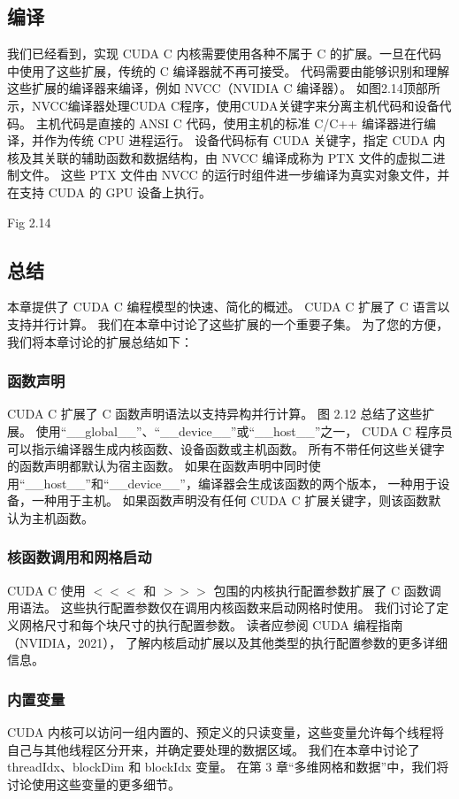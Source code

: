 \subsection{编译}
我们已经看到，实现 CUDA C 内核需要使用各种不属于 C 的扩展。一旦在代码中使用了这些扩展，传统的 C 编译器就不再可接受。 
代码需要由能够识别和理解这些扩展的编译器来编译，例如 NVCC（NVIDIA C 编译器）。 
如图2.14顶部所示，NVCC编译器处理CUDA C程序，使用CUDA关键字来分离主机代码和设备代码。 
主机代码是直接的 ANSI C 代码，使用主机的标准 C/C++ 编译器进行编译，并作为传统 CPU 进程运行。 
设备代码标有 CUDA 关键字，指定 CUDA 内核及其关联的辅助函数和数据结构，由 NVCC 编译成称为 PTX 文件的虚拟二进制文件。 
这些 PTX 文件由 NVCC 的运行时组件进一步编译为真实对象文件，并在支持 CUDA 的 GPU 设备上执行。

{\color{red} Fig 2.14}

\subsection{总结}
本章提供了 CUDA C 编程模型的快速、简化的概述。 CUDA C 扩展了 C 语言以支持并行计算。 
我们在本章中讨论了这些扩展的一个重要子集。 为了您的方便，我们将本章讨论的扩展总结如下：

\subsubsection{函数声明}
CUDA C 扩展了 C 函数声明语法以支持异构并行计算。 图 2.12 总结了这些扩展。 
使用“\_\_global\_\_”、“\_\_device\_\_”或“\_\_host\_\_”之一，
CUDA C 程序员可以指示编译器生成内核函数、设备函数或主机函数。 所有不带任何这些关键字的函数声明都默认为宿主函数。 
如果在函数声明中同时使用“\_\_host\_\_”和“\_\_device\_\_”，编译器会生成该函数的两个版本，
一种用于设备，一种用于主机。 如果函数声明没有任何 CUDA C 扩展关键字，则该函数默认为主机函数。

\subsubsection{核函数调用和网格启动}
CUDA C 使用 $<<<$ 和 $>>>$ 包围的内核执行配置参数扩展了 C 函数调用语法。
这些执行配置参数仅在调用内核函数来启动网格时使用。 
我们讨论了定义网格尺寸和每个块尺寸的执行配置参数。 读者应参阅 CUDA 编程指南（NVIDIA，2021），
了解内核启动扩展以及其他类型的执行配置参数的更多详细信息。


\subsubsection{内置变量}
CUDA 内核可以访问一组内置的、预定义的只读变量，这些变量允许每个线程将自己与其他线程区分开来，并确定要处理的数据区域。 
我们在本章中讨论了 threadIdx、blockDim 和 blockIdx 变量。 
在第 3 章“多维网格和数据”中，我们将讨论使用这些变量的更多细节。

